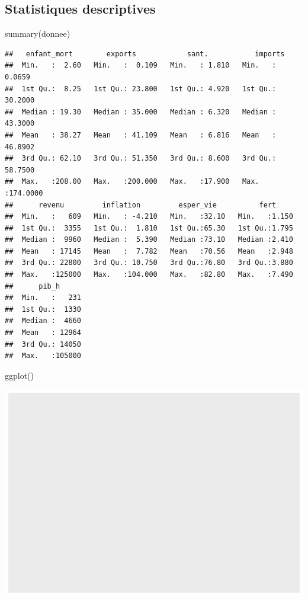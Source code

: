 \documentclass[
]{article}
\newenvironment{Shaded}{}{}
\newcommand{\FunctionTok}[1]{#1}
\newcommand{\NormalTok}[1]{#1}
\begin{document}
\hypertarget{statistiques-descriptives}{%
\subsection{Statistiques descriptives}\label{statistiques-descriptives}}

\begin{Shaded}
\begin{Highlighting}[]
\FunctionTok{summary}\NormalTok{(donnee)}
\end{Highlighting}
\end{Shaded}

\begin{verbatim}
##   enfant_mort        exports            sant.           imports        
##  Min.   :  2.60   Min.   :  0.109   Min.   : 1.810   Min.   :  0.0659  
##  1st Qu.:  8.25   1st Qu.: 23.800   1st Qu.: 4.920   1st Qu.: 30.2000  
##  Median : 19.30   Median : 35.000   Median : 6.320   Median : 43.3000  
##  Mean   : 38.27   Mean   : 41.109   Mean   : 6.816   Mean   : 46.8902  
##  3rd Qu.: 62.10   3rd Qu.: 51.350   3rd Qu.: 8.600   3rd Qu.: 58.7500  
##  Max.   :208.00   Max.   :200.000   Max.   :17.900   Max.   :174.0000  
##      revenu         inflation         esper_vie          fert      
##  Min.   :   609   Min.   : -4.210   Min.   :32.10   Min.   :1.150  
##  1st Qu.:  3355   1st Qu.:  1.810   1st Qu.:65.30   1st Qu.:1.795  
##  Median :  9960   Median :  5.390   Median :73.10   Median :2.410  
##  Mean   : 17145   Mean   :  7.782   Mean   :70.56   Mean   :2.948  
##  3rd Qu.: 22800   3rd Qu.: 10.750   3rd Qu.:76.80   3rd Qu.:3.880  
##  Max.   :125000   Max.   :104.000   Max.   :82.80   Max.   :7.490  
##      pib_h       
##  Min.   :   231  
##  1st Qu.:  1330  
##  Median :  4660  
##  Mean   : 12964  
##  3rd Qu.: 14050  
##  Max.   :105000
\end{verbatim}

\begin{Shaded}
\begin{Highlighting}[]
\FunctionTok{ggplot}\NormalTok{()}
\end{Highlighting}
\end{Shaded}

\includegraphics{Projet_files/figure-latex/unnamed-chunk-7-1.pdf}
\end{document}
